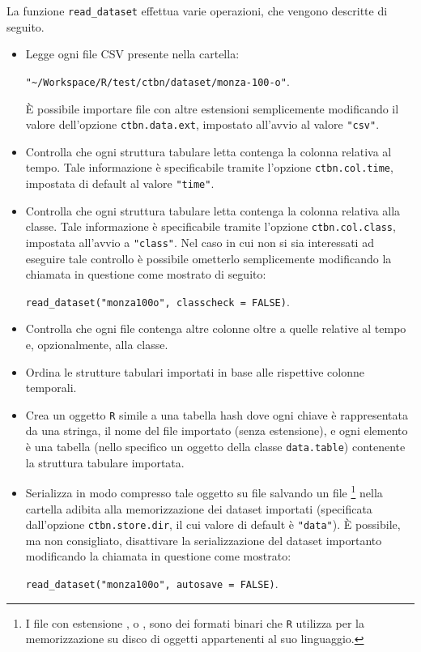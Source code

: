 La funzione \lstinline[language=rstats]{read_dataset} effettua varie operazioni, che vengono descritte di seguito.
\begin{itemize}
	\item Legge ogni file \acs{CSV} presente nella cartella:\par
	\lstinline[language=rstats]{"~/Workspace/R/test/ctbn/dataset/monza-100-o"}.\par
	\`E possibile importare file con altre estensioni semplicemente modificando il valore dell'opzione \lstinline$ctbn.data.ext$, impostato all'avvio al valore \lstinline[language=rstats]{"csv"}.
	\item Controlla che ogni struttura tabulare letta contenga la colonna relativa al tempo. Tale informazione è specificabile tramite l'opzione \lstinline$ctbn.col.time$, impostata di default al valore \lstinline[language=rstats]{"time"}.
	\item Controlla che ogni struttura tabulare letta contenga la colonna relativa alla classe. Tale informazione è specificabile tramite l'opzione \lstinline$ctbn.col.class$, impostata all'avvio a \lstinline[language=rstats]{"class"}. Nel caso in cui non si sia interessati ad eseguire tale controllo è possibile ometterlo semplicemente modificando la chiamata in questione come mostrato di seguito:\par
	\lstinline[language=rstats]{read_dataset("monza100o", classcheck = FALSE)}.
	\item Controlla che ogni file contenga altre colonne oltre a quelle relative al tempo e, opzionalmente, alla classe.
	\item Ordina le strutture tabulari importati in base alle rispettive colonne temporali.
	\item Crea un oggetto \lstinline$R$ simile a una tabella hash dove ogni chiave è rappresentata da una stringa, il nome del file importato (senza estensione), e ogni elemento è una tabella (nello specifico un oggetto della classe \lstinline$data.table$) contenente la struttura tabulare importata.
	\item Serializza in modo compresso tale oggetto su file salvando un file \footnote{I file con estensione , o , sono dei formati binari che \lstinline$R$ utilizza per la memorizzazione su disco di oggetti appartenenti al suo linguaggio.} nella cartella adibita alla memorizzazione dei dataset importati (specificata dall'opzione \lstinline$ctbn.store.dir$, il cui valore di default è \lstinline[language=rstats]{"data"}). \`E possibile, ma non consigliato, disattivare la serializzazione del dataset importanto modificando la chiamata in questione come mostrato:\par
	\lstinline[language=rstats]{read_dataset("monza100o", autosave = FALSE)}.
\end{itemize}

